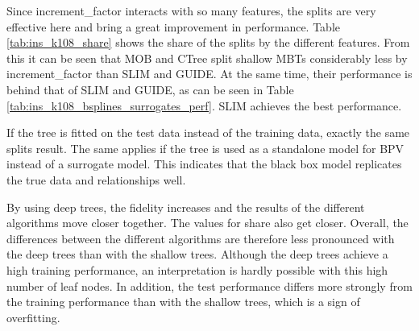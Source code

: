 Since increment\_factor interacts with so many features, the splits are very effective here and bring a great improvement in performance. Table \ref{tab:ins_k108_share} shows the share of the splits by the different features. From this it can be seen that MOB and CTree split shallow MBTs considerably less by increment\_factor than SLIM and GUIDE. At the same time, their performance is behind that of SLIM and GUIDE, as can be seen in Table \ref{tab:ins_k108_bsplines_surrogates_perf}. SLIM achieves the best performance.


If the tree is fitted on the test data instead of the training data, exactly the same splits result. The same applies if the tree is used as a standalone model for BPV instead of a surrogate model. This indicates that the black box model replicates the true data and relationships well.




By using deep trees, the fidelity increases and the results of the different algorithms move closer together. The values for share also get closer. Overall, the differences between the different algorithms are therefore less pronounced with the deep trees than with the shallow trees. Although the deep trees achieve a high training performance, an interpretation is hardly possible with this high number of leaf nodes. In addition, the test performance differs more strongly from the training performance than with the shallow trees, which is a sign of overfitting.



